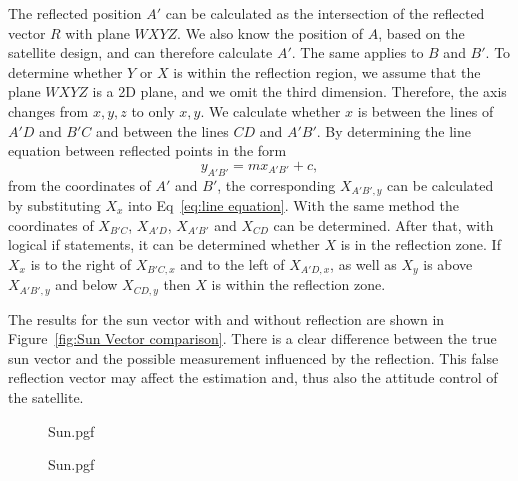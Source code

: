 The reflected position $A'$ can be calculated as the intersection of the reflected vector $R$ with plane $WXYZ$. We also know the position of $A$, based on the satellite design, and can therefore calculate $A'$. The same applies to $B$ and $B'$. To determine whether $Y$ or $X$ is within the reflection region, we assume that the plane $WXYZ$ is a 2D plane, and we omit the third dimension. Therefore, the axis changes from $x, y, z$ to only $x, y$. We calculate whether $x$ is between the lines of $A'D$ and $B'C$ and between the lines $CD$ and $A'B'$. By determining the line equation between reflected points in the form 
\begin{equation}
y_{A'B'} = mx_{A'B'} + c,
\label{eq:line equation}
\end{equation}
from the coordinates of $A'$ and $B'$, the corresponding $X_{A'B',y}$ can be calculated by substituting $X_x$ into Eq~\ref{eq:line equation}. With the same method the coordinates of $X_{B'C}$, $X_{A'D}$, $X_{A'B'}$ and $X_{CD}$ can be determined. After that, with logical if statements, it can be determined whether $X$ is in the reflection zone. If $X_x$ is to the right of $X_{B'C,x}$ and to the left of $X_{A'D,x}$, as well as $X_y$ is above $X_{A'B',y}$ and below $X_{CD,y}$ then $X$ is within the reflection zone. 

The results for the sun vector with and without reflection are shown in Figure~\ref{fig:Sun Vector comparison}. There is a clear difference between the true sun vector and the possible measurement influenced by the reflection.  This false reflection vector may affect the estimation and, thus also the attitude control of the satellite.

\begin{figure*}[!htb]
	\begin{subfigure}{.5\textwidth}
		\centering
		{Sun.pgf}
		\label{fig:Sun Vector comparison with reflection}
	\end{subfigure}
	\begin{subfigure}{.5\textwidth}
		\centering
		{Sun.pgf} 
		\label{fig:Sun Vector comparison without reflection}
	\end{subfigure}
	\caption{Comparison of measured sun vector with and without reflections (gray areas indicate the eclipse period of the orbit)}
	\label{fig:Sun Vector comparison}
	
\end{figure*}

